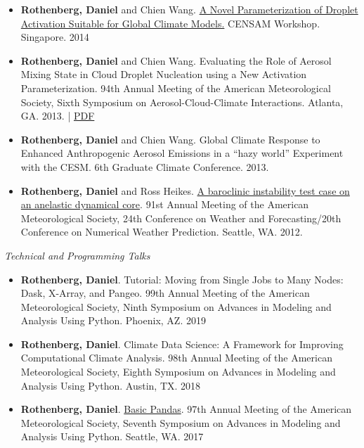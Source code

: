 \documentclass[11pt,letterpaper]{article}
\begin{document}
\begin{itemize}[itemindent=-10pt]
 \item \textbf{Rothenberg, Daniel} and Chien Wang. \href{http://figshare.com/articles/A_Novel_Parameterization_of_Droplet_Activation_Suitable_for_Global_Climate_Models/1085984}{A Novel Parameterization of Droplet Activation Suitable for Global Climate Models.} CENSAM Workshop. Singapore. 2014

 \item \textbf{Rothenberg, Daniel} and Chien Wang. Evaluating the Role of Aerosol Mixing State in Cloud Droplet Nucleation using a New Activation Parameterization. 94th Annual Meeting of the American Meteorological Society, Sixth Symposium on Aerosol-Cloud-Climate Interactions. Atlanta, GA. 2013. | \href{https://figshare.com/articles/AMS_2014_Evaluating_the_Role_of_Aerosol_Mixing_State_in_Cloud_Droplet_Nucleation_towards_Developing_a_New_Activation_Parameterization/918655}{PDF}

 \item \textbf{Rothenberg, Daniel} and Chien Wang. Global Climate Response to Enhanced Anthropogenic Aerosol Emissions in a ``hazy world'' Experiment with the CESM. 6th Graduate Climate Conference. 2013.

 \item \textbf{Rothenberg, Daniel} and Ross Heikes. \href{https://ams.confex.com/ams/91Annual/webprogram/Paper180796.html}{A baroclinic instability test case on an anelastic dynamical core}. 91st Annual Meeting of the American Meteorological Society, 24th Conference on Weather and Forecasting/20th Conference on Numerical Weather Prediction. Seattle, WA. 2012.
\end{itemize}


\bigskip
\emph{Technical and Programming Talks}
\medskip
\begin{itemize}[itemindent=-10pt]

 \item \textbf{Rothenberg, Daniel}. Tutorial: Moving from Single Jobs to Many Nodes: Dask, X-Array, and Pangeo. 99th Annual Meeting of the American Meteorological Society, Ninth Symposium on Advances in Modeling and Analysis Using Python. Phoenix, AZ. 2019

 \item \textbf{Rothenberg, Daniel}. Climate Data Science: A Framework for Improving Computational Climate Analysis. 98th Annual Meeting of the American Meteorological Society, Eighth Symposium on Advances in Modeling and Analysis Using Python. Austin, TX. 2018

 \item \textbf{Rothenberg, Daniel}. \href{https://github.com/darothen/python_for_climate_data_science/blob/master/basic_pandas.ipynb}{Basic Pandas}. 97th Annual Meeting of the American Meteorological Society, Seventh Symposium on Advances in Modeling and Analysis Using Python. Seattle, WA. 2017

\end{itemize}
\end{document}
